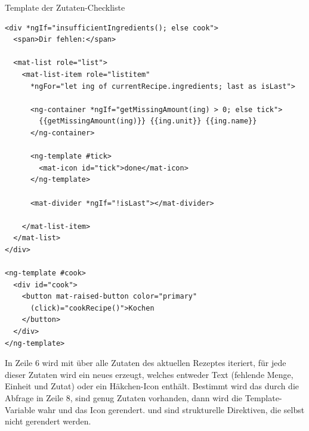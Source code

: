 \begin{listing}
\caption{Template der Zutaten-Checkliste}
\label{lst:listing20}
\begin{verbatim}
<div *ngIf="insufficientIngredients(); else cook">
  <span>Dir fehlen:</span>

  <mat-list role="list">
    <mat-list-item role="listitem"
      *ngFor="let ing of currentRecipe.ingredients; last as isLast">

      <ng-container *ngIf="getMissingAmount(ing) > 0; else tick">
        {{getMissingAmount(ing)}} {{ing.unit}} {{ing.name}}
      </ng-container>

      <ng-template #tick>
        <mat-icon id="tick">done</mat-icon>
      </ng-template>

      <mat-divider *ngIf="!isLast"></mat-divider>

    </mat-list-item>
  </mat-list>
</div>

<ng-template #cook>
  <div id="cook">
    <button mat-raised-button color="primary"
      (click)="cookRecipe()">Kochen
    </button>
  </div>
</ng-template>
\end{verbatim}
\end{listing}

In Zeile 6 wird mit  über alle Zutaten des aktuellen Rezeptes iteriert, für jede dieser Zutaten wird ein neues  erzeugt, welches entweder Text (fehlende Menge, Einheit und Zutat) oder ein Häkchen-Icon enthält. Bestimmt wird das durch die Abfrage in Zeile 8, sind genug Zutaten vorhanden, dann wird die Template-Variable  wahr und das Icon gerendert.  und  sind strukturelle Direktiven, die selbst nicht gerendert werden.

